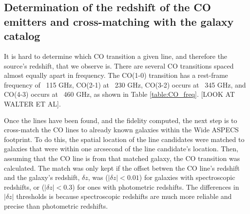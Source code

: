 \subsection{Determination of the redshift of the CO emitters and cross-matching with the galaxy catalog}

It is hard to determine which CO transition a given line, and therefore the source's redshift, that we observe is. There are several CO transitions spaced almost equally apart in frequency. The CO(1-0) transition has a rest-frame frequency of ~115 GHz, CO(2-1) at ~230 GHz, CO(3-2) occurs at ~345 GHz, and CO(4-3) occurs at ~460 GHz, as shown in Table \ref{table:CO_freq}. [LOOK AT WALTER ET AL]. 


Once the lines have been found, and the fidelity computed, the next step is to cross-match the CO lines to already known galaxies within the Wide ASPECS footprint. To do this, the spatial location of the line candidates were matched to galaxies that were within one arcsecond of the line candidate's location. Then, assuming that the CO line is from that matched galaxy, the CO transition was calculated. The match was only kept if the offset betwen the CO line's redshift and the galaxy's redshift, $\delta z$, was ($|\delta z| < 0.01$) for galaxies with spectroscopic redshifts, or ($|\delta z| < 0.3$) for ones with photometric redshifts. The differences in $|\delta z|$ thresholds is because spectroscopic redshifts are much more reliable and precise than photometric redshifts. 

